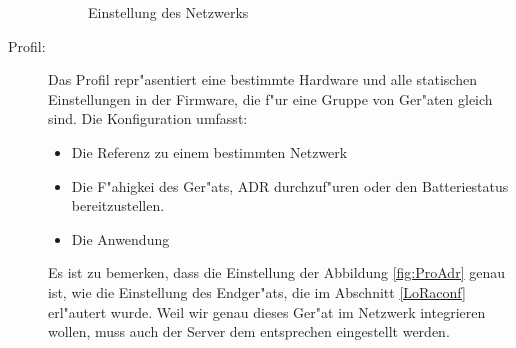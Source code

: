 \begin{description}
	\begin{figure}[h!]
		\centering
		\caption{Einstellung des Netzwerks}
	\end{figure}


	
	\item[Profil:] Das Profil repr"asentiert eine bestimmte Hardware und
	alle statischen Einstellungen in der Firmware, die f"ur eine Gruppe
	von Ger"aten gleich sind. Die Konfiguration umfasst:
	\begin{itemize}
		\item Die Referenz zu einem bestimmten Netzwerk
		\item Die F"ahigkei des Ger"ats, \ac{ADR} 
		durchzuf"uren oder den Batteriestatus bereitzustellen.
		\item Die Anwendung
	\end{itemize} 
	Es ist zu bemerken, dass die Einstellung der Abbildung
	\ref{fig:ProAdr} genau ist, wie die Einstellung des Endger"ats, die
	im Abschnitt \ref{LoRaconf} erl"autert wurde. Weil wir genau dieses
	Ger"at im Netzwerk integrieren wollen, muss auch der Server
	dem entsprechen eingestellt werden.


\end{description}
